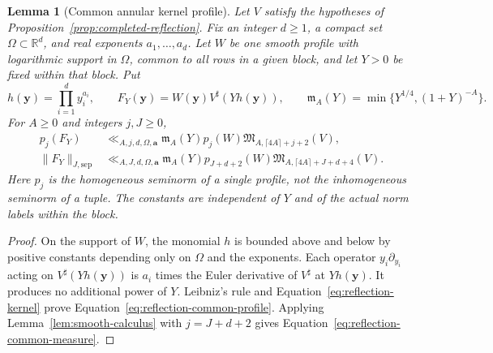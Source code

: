 \documentclass[11pt,a4paper]{article}
\numberwithin{equation}{section}
\numberwithin{figure}{section}
\newtheorem{lemma}[theorem]{Lemma}
\theoremstyle{definition}
\theoremstyle{remark}
\begin{document}
\begin{lemma}[Common annular kernel profile]
\label{lem:reflection-common-profile}
Let $V$ satisfy the hypotheses of Proposition~\ref{prop:completed-reflection}.
Fix an integer $d\ge1$, a compact set $\Omega\subset\mathbb R^d$, and real
exponents $a_1,\ldots,a_d$.  Let $W$ be one smooth profile with logarithmic support
in $\Omega$, common to all rows in a given block, and let $Y>0$ be fixed
within that block.  Put
\[
 h(\boldsymbol y)=\prod_{i=1}^d y_i^{a_i},\qquad
 F_Y(\boldsymbol y)=W(\boldsymbol y)V^\sharp(Yh(\boldsymbol y)),\qquad
 \mathfrak m_A(Y)=\min\{Y^{1/4},(1+Y)^{-A}\}.
\]
For $A\ge0$ and integers $j,J\ge0$,
\begin{align}
 p_j(F_Y)&\ll_{A,j,d,\Omega,\boldsymbol a}
 \mathfrak m_A(Y)p_j(W)
 \mathfrak M_{A,\lceil4A\rceil+j+2}(V),
 \label{eq:reflection-common-profile}\\
 \|F_Y\|_{J,\mathrm{sep}}&\ll_{A,J,d,\Omega,\boldsymbol a}
 \mathfrak m_A(Y)p_{J+d+2}(W)
 \mathfrak M_{A,\lceil4A\rceil+J+d+4}(V).
 \label{eq:reflection-common-measure}
\end{align}
Here $p_j$ is the homogeneous seminorm of a single profile, not the
inhomogeneous seminorm of a tuple.  The constants are independent of $Y$
and of the actual norm labels within the block.
\end{lemma}

\begin{proof}
On the support of $W$, the monomial $h$ is bounded above and below by
positive constants depending only on $\Omega$ and the exponents.  Each
operator $y_i\partial_{y_i}$ acting on $V^\sharp(Yh(\boldsymbol y))$ is
$a_i$ times the Euler derivative of $V^\sharp$ at $Yh(\boldsymbol y)$.
It produces no additional power of $Y$.  Leibniz's rule and
Equation~\eqref{eq:reflection-kernel} prove
Equation~\eqref{eq:reflection-common-profile}.  Applying
Lemma~\ref{lem:smooth-calculus} with $j=J+d+2$ gives
Equation~\eqref{eq:reflection-common-measure}.
\end{proof}
\end{document}
